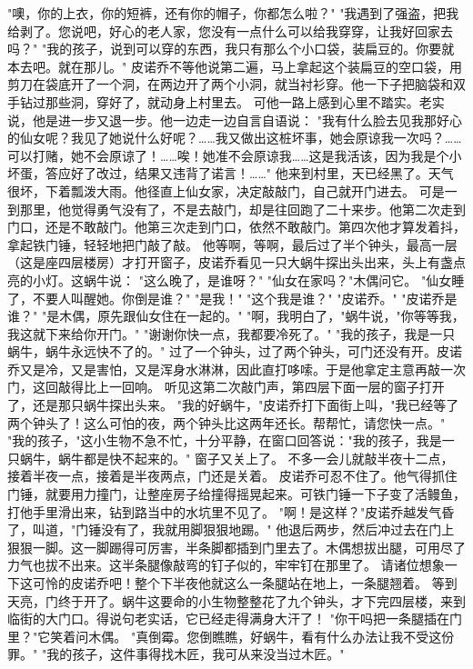 \documentclass[12pt,UTF8]{ctexbook}
\begin{document}
"噢，你的上衣，你的短裤，还有你的帽子，你都怎么啦？"
"我遇到了强盗，把我给剥了。您说吧，好心的老人家，您没有一点什么可以给我穿穿，让我好回家去吗？"
"我的孩子，说到可以穿的东西，我只有那么个小口袋，装扁豆的。你要就本去吧。就在那儿。"
皮诺乔不等他说第二遍，马上拿起这个装扁豆的空口袋，用剪刀在袋底开了一个洞，在两边开了两个小洞，就当衬衫穿。他一下子把脑袋和双手钻过那些洞，穿好了，就动身上村里去。
可他一路上感到心里不踏实。老实说，他是进一步又退一步。他一边走一边自言自语说：
"我有什么脸去见我那好心的仙女呢？我见了她说什么好呢？……我又做出这桩坏事，她会原谅我一次吗？……可以打赌，她不会原谅了！……唉！她准不会原谅我……这是我活该，因为我是个小坏蛋，答应好了改过，结果又违背了诺言！……"
他来到村里，天已经黑了。天气很坏，下着瓢泼大雨。他径直上仙女家，决定敲敲门，自己就开门进去。
可是一到那里，他觉得勇气没有了，不是去敲门，却是往回跑了二十来步。他第二次走到门口，还是不敢敲门。他第三次走到门口，依然不敢敲门。第四次他才算发着抖，拿起铁门锤，轻轻地把门敲了敲。
他等啊，等啊，最后过了半个钟头，最高一层（这是座四层楼房）才打开窗子，皮诺乔看见一只大蜗牛探出头出来，头上有盏点亮的小灯。这蜗牛说：
"这么晚了，是谁呀？"
"仙女在家吗？"木偶问它。
"仙女睡了，不要人叫醒她。你倒是谁？"
"是我！"
"这个我是谁？"
"皮诺乔。"
"皮诺乔是谁？"
"是木偶，原先跟仙女住在一起的。"
"啊，我明白了，"蜗牛说，"你等等我，我这就下来给你开门。"
"谢谢你快一点，我都要冷死了。"
"我的孩子，我是一只蜗牛，蜗牛永远快不了的。"
过了一个钟头，过了两个钟头，可门还没有开。皮诺乔又是冷，又是害怕，又是浑身水淋淋，因此直打哆嗦。于是他拿定主意再敲一次门，这回敲得比上一回响。
听见这第二次敲门声，第四层下面一层的窗子打开了，还是那只蜗牛探出头来。
"我的好蜗牛，"皮诺乔打下面街上叫，"我已经等了两个钟头了！这么可怕的夜，两个钟头比这两年还长。帮帮忙，请您快一点。"
"我的孩子，"这小生物不急不忙，十分平静，在窗口回答说："我的孩子，我是一只蜗牛，蜗牛都是快不起来的。"
窗子又关上了。
不多一会儿就敲半夜十二点，接着半夜一点，接着是半夜两点，门还是关着。
皮诺乔可忍不住了。他气得抓住门锤，就要用力撞门，让整座房子给撞得摇晃起来。可铁门锤一下子变了活鳗鱼，打他手里滑出来，钻到路当中的水坑里不见了。
"啊！是这样？"皮诺乔越发气昏了，叫道，"门锤没有了，我就用脚狠狠地踢。"
他退后两步，然后冲过去在门上狠狠一脚。这一脚踢得可厉害，半条脚都插到门里去了。木偶想拔出腿，可用尽了力气也拔不出来。这半条腿像敲弯的钉子似的，牢牢钉在那里了。
请诸位想象一下这可怜的皮诺乔吧！整个下半夜他就这么一条腿站在地上，一条腿翘着。
等到天亮，门终于开了。蜗牛这要命的小生物整整花了九个钟头，才下完四层楼，来到临街的大门口。得说句老实话，它已经走得满身大汗了！
"你干吗把一条腿插在门里？"它笑着问木偶。
"真倒霉。您倒瞧瞧，好蜗牛，看有什么办法让我不受这份罪。"
"我的孩子，这件事得找木匠，我可从来没当过木匠。"
\end{document}
